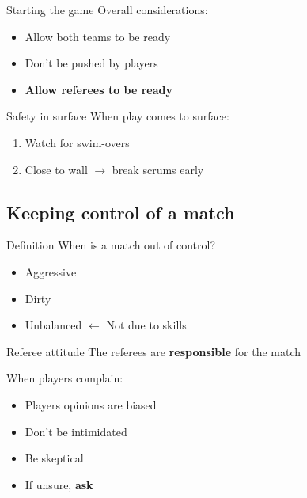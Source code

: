 \documentclass{beamer}
\begin{document}
    \begin{frame}{Starting the game}
        Overall considerations:
        \begin{itemize}
            \item Allow both teams to be ready
            \item Don't be pushed by players
            \item \textbf{Allow referees to be ready}
        \end{itemize}
    \end{frame}

    \begin{frame}{Safety in surface}
        When play comes to surface:
        \begin{enumerate}
            \item Watch for swim-overs
            \item Close to wall $\rightarrow$ break scrums early
        \end{enumerate}
    \end{frame}

    \subsection{Keeping control of a match}

    \begin{frame}{Definition}
        When is a match out of control?

        \pause

        \begin{itemize}
            \item Aggressive
            \item Dirty
            \item Unbalanced $\leftarrow$ Not due to skills
        \end{itemize}
    \end{frame}

    \begin{frame}{Referee attitude}
        The referees are \textbf{responsible} for the match

        When players complain:
        \begin{itemize}
            \item Players opinions are biased
            \item Don't be intimidated
            \item Be skeptical
            \item If unsure, \textbf{ask}
        \end{itemize}
    \end{frame}
\end{document}
